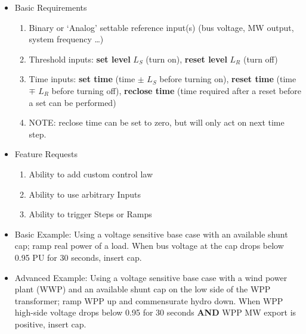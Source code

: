 \documentclass[12pt]{article}
\begin{document}
\begin{multicols*}{2}
\begin{itemize}
	\item Basic Requirements
	\begin{enumerate}
		\item Binary or `Analog' settable reference input(s) (bus voltage, MW output, system frequency \ldots) 
		\item Threshold inputs: \textbf{set level} $L_S$ (turn on), \textbf{reset level} $L_R$ (turn off)
		\item Time inputs: \textbf{set time} (time $\pm$ $L_S$ before turning on), \textbf{reset time} (time $\mp$ $L_R$ before turning off), \textbf{reclose time} (time required after a reset before a set can be performed)
		\item NOTE: reclose time can be set to zero, but will only act on next time step.
	\end{enumerate}
	\item Feature Requests
	\begin{enumerate}
		\item Ability to add custom control law
		\item Ability to use arbitrary Inputs
		\item Ability to trigger Steps or Ramps
	\end{enumerate}
	\item Basic Example: Using a voltage sensitive base case with an available shunt cap; ramp real power of a load. When bus voltage at the cap drops below 0.95 PU for 30 seconds, insert cap.
	\item Advanced Example: Using a voltage sensitive base case with a wind power plant (WWP) and an available shunt cap on the low side of the WPP transformer; ramp WPP up and commensurate hydro down. When WPP high-side voltage drops below 0.95 for 30 seconds \textbf{AND} WPP MW export is positive, insert cap.
\end{itemize}

\vfill\null
\end{multicols*}
\end{document}
